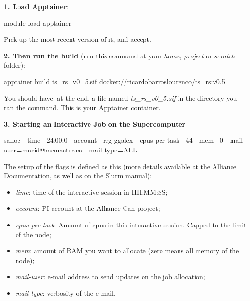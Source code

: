 \documentclass[
]{book}
\newenvironment{Shaded}{\begin{snugshade}}{\end{snugshade}}
\newcommand{\AttributeTok}[1]{\textcolor[rgb]{0.77,0.63,0.00}{#1}}
\newcommand{\ExtensionTok}[1]{#1}
\newcommand{\NormalTok}[1]{#1}
\newcommand{\OperatorTok}[1]{\textcolor[rgb]{0.81,0.36,0.00}{\textbf{#1}}}
\providecommand{\tightlist}{%
  \setlength{\itemsep}{0pt}\setlength{\parskip}{0pt}}
\begin{document}
\textbf{1. Load Apptainer}:

\begin{Shaded}
\begin{Highlighting}[]
\ExtensionTok{module}\NormalTok{ load apptainer}
\end{Highlighting}
\end{Shaded}

Pick up the most recent version of it, and accept.

\textbf{2. Then run the build} (run this command at your \emph{home}, \emph{project} or \emph{scratch} folder):

\begin{Shaded}
\begin{Highlighting}[]
\ExtensionTok{apptainer}\NormalTok{ build ts\_rs\_v0\_5.sif docker://ricardobarroslourenco/ts\_rs:v0.5}
\end{Highlighting}
\end{Shaded}

You should have, at the end, a file named \emph{ts\_rs\_v0\_5.sif} in the
directory you ran the command. This is your Apptainer container.

\textbf{3. Starting an Interactive Job on the Supercomputer}

\begin{Shaded}
\begin{Highlighting}[]
\ExtensionTok{salloc} \AttributeTok{{-}{-}time}\OperatorTok{=}\NormalTok{24:00:0 }\AttributeTok{{-}{-}account}\OperatorTok{=}\NormalTok{rrg{-}ggalex }\AttributeTok{{-}{-}cpus{-}per{-}task}\OperatorTok{=}\NormalTok{44 }\AttributeTok{{-}{-}mem}\OperatorTok{=}\NormalTok{0 }\AttributeTok{{-}{-}mail{-}user}\OperatorTok{=}\NormalTok{macid@mcmaster.ca }\AttributeTok{{-}{-}mail{-}type}\OperatorTok{=}\NormalTok{ALL}
\end{Highlighting}
\end{Shaded}

The setup of the flags is defined as this (more details available at the Alliance Documentation, as well as on the Slurm manual):

\begin{itemize}
\tightlist
\item
  \emph{time}: time of the interactive session in HH:MM:SS;
\item
  \emph{account}: PI account at the Alliance Can project;
\item
  \emph{cpus-per-task}: Amount of cpus in this interactive session. Capped to the limit of the node;
\item
  \emph{mem}: amount of RAM you want to allocate (zero means all memory of the node);
\item
  \emph{mail-user}: e-mail address to send updates on the job allocation;
\item
  \emph{mail-type}: verbosity of the e-mail.
\end{itemize}
\end{document}
